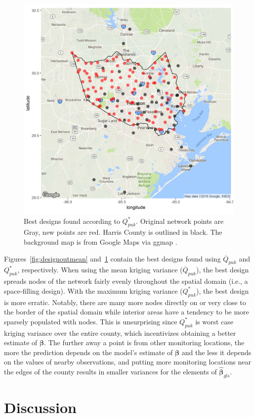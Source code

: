 \documentclass[cmbright]{staauth}
\begin{document}
\begin{figure}[p]
\centering
\includegraphics[width=.8\textwidth]{sig2pukmax.png}
\caption{Best designs found according to $Q^*_{puk}$. Original network points are Gray, new points are red. Harris County is outlined in black. The background map is from Google Maps via ggmap \citep{ggmap2013}.}
\label{fig:designoutmax}
\end{figure}

Figures~\ref{fig:designoutmean} and~\ref{fig:designoutmax} contain the best designs found using $\overline{Q}_{puk}$ and $Q^*_{puk}$, respectively. When using the mean kriging variance ($\overline{Q}_{puk}$), the best design spreads nodes of the network fairly evenly throughout the spatial domain (i.e., a space-filling design). With the maximum kriging variance ($Q^*_{puk}$), the best design is more erratic. Notably, there are many more nodes directly on or very close to the border of the spatial domain while interior areas have a tendency to be more sparsely populated with nodes. This is unsurprising since $Q^*_{puk}$ is worst case kriging variance over the entire county, which incentivizes obtaining a better estimate of $\bm{\beta}$. The further away a point is from other monitoring locations, the more the prediction depends on the model's estimate of $\bm{\beta}$ and the less it depends on the values of nearby observations, and putting more monitoring locations near the edges of the county results in smaller variances for the elements of $\widehat{\bm{\beta}}_{gls}$.

\section{Discussion}\label{sec:discuss}
\end{document}
